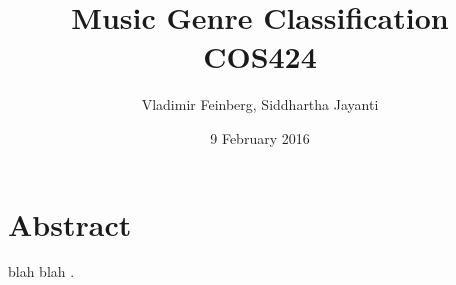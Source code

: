 \documentclass{article}
\title{Music Genre Classification\\\large COS424}
\author{Vladimir Feinberg, Siddhartha Jayanti}
\date{9 February 2016}
\begin{document}
\maketitle

\section{Abstract}

 blah blah \cite{davis2012fractional}.



\end{document}
